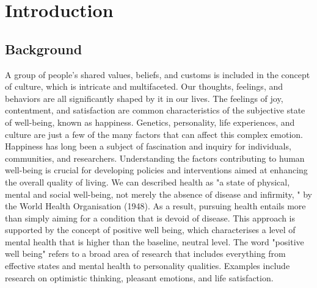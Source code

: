 \documentclass[12pt, a4paper, twoside]{report}
\theoremstyle{plain} %
\theoremstyle{definition} %
\theoremstyle{remark} %
\numberwithin{equation}{chapter}
\begin{document}
\begin{abstract}
Happiness and well-being have been extensively studied across the social sciences. However, the relationship between culture and happiness remains less explored. This thesis investigates the role of culture in predicting happiness through a machine-learning approach.
Using the World Happiness Report dataset, life satisfaction, and cultural dimensions like Social support, Life ladder, and perception of corruption across the world, classification models are trained to predict the happiness of life.

Results indicate that culture does play a significant role in determining happiness. Social support and Log GDP per capita are the most influential positive factors, while perception of corruption was negatively associated. On the World Happiness Report dataset, this study analyses five classifiers: logistic regression, random forest, decision tree, KNN, and support vector machine. The Random Forest achieves top results on several key metrics including accuracy (0.91), precision (0.9058), AUC score (0.9089), and a high F1 score (0.9094). This indicates the Random Forest model balances both precision and recall to effectively minimize classification errors. 

\end{abstract}

\chapter{Introduction}\label{ch:1}
\section{Background}
A group of people's shared values, beliefs, and customs is included in the concept of culture, which is intricate and multifaceted. Our thoughts, feelings, and behaviors are all significantly shaped by it in our lives. The feelings of joy, contentment, and satisfaction are common characteristics of the subjective state of well-being, known as happiness. Genetics, personality, life experiences, and culture are just a few of the many factors that can affect this complex emotion.\\

Happiness has long been a subject of fascination and inquiry for individuals, communities, and researchers. Understanding the factors contributing to human well-being is crucial for developing policies and interventions aimed at enhancing the overall quality of living. We can described health as "a state of physical, mental and social well-being, not merely the absence of disease and infirmity, " by the World Health Organisation (1948). As a result, pursuing health entails more than simply aiming for a condition that is devoid of disease. This approach is supported by the concept of positive well being, which characterises a level of mental health that is higher than the baseline, neutral level. The word "positive well being" refers to a broad area of research that includes everything from effective states and mental health to personality qualities. Examples include research on optimistic thinking, pleasant emotions, and life satisfaction.
\end{document}
